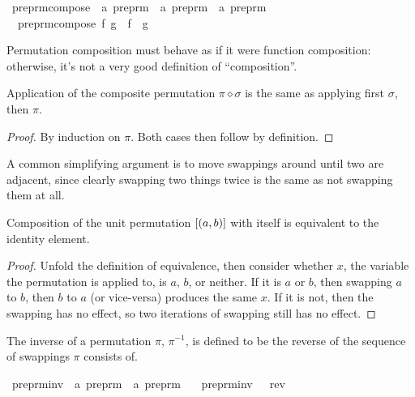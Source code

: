 \begin{implementation}
\isamarkupfalse%
\ preprm{\isacharunderscore}compose\ {\isacharcolon}{\isacharcolon}\ {\isachardoublequoteopen}{\isacharprime}a\ preprm\ {\isasymRightarrow}\ {\isacharprime}a\ preprm\ {\isasymRightarrow}\ {\isacharprime}a\ preprm{\isachardoublequoteclose}\ \isanewline
\ \ {\isachardoublequoteopen}preprm{\isacharunderscore}compose\ f\ g\ {\isasymequiv}\ f\ {\isacharat}\ g{\isachardoublequoteclose}\isanewline
\end{implementation}

Permutation composition must behave as if it were function composition: otherwise, it's not a very good definition of ``composition''.

\begin{lemma}
\label{lemma:apply-composition}
Application of the composite permutation \(\pi \diamond \sigma\) is the same as applying first \(\sigma\), then \(\pi\).
\end{lemma}
\begin{proof}
By induction on \(\pi\).
Both cases then follow by definition.
\end{proof}

A common simplifying argument is to move swappings around until two are adjacent, since clearly swapping two things twice is the same as not swapping them at all.

\begin{lemma}
\label{lemma:unit-involution}
Composition of the unit permutation \([\left(a, b\right)]\) with itself is equivalent to the identity element.
\end{lemma}
\begin{proof}
Unfold the definition of equivalence, then consider whether \(x\), the variable the permutation is applied to, is \(a\), \(b\), or neither.
If it is \(a\) or \(b\), then swapping \(a\) to \(b\), then \(b\) to \(a\) (or vice-versa) produces the same \(x\).
If it is not, then the swapping has no effect, so two iterations of swapping still has no effect.
\end{proof}

\begin{definition}
The inverse of a permutation \(\pi\), \(\pi^{-1}\), is defined to be the reverse of the sequence of swappings \(\pi\) consists of.
\end{definition}

\begin{implementation}
\isamarkupfalse%
\ preprm{\isacharunderscore}inv\ {\isacharcolon}{\isacharcolon}\ {\isachardoublequoteopen}{\isacharprime}a\ preprm\ {\isasymRightarrow}\ {\isacharprime}a\ preprm{\isachardoublequoteclose}\ \isanewline
\ \ {\isachardoublequoteopen}preprm{\isacharunderscore}inv\ {\isasympi}\ {\isasymequiv}\ rev\ {\isasympi}{\isachardoublequoteclose}\isanewline
\end{implementation}

